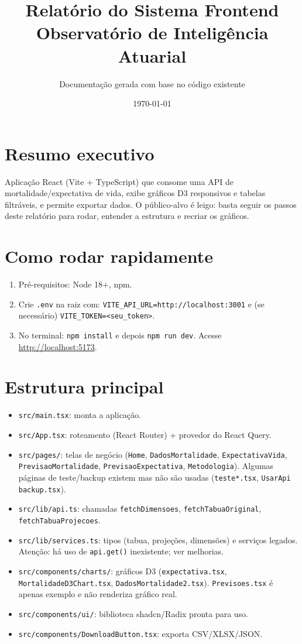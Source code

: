 \documentclass[12pt,a4paper]{article}
\title{Relatório do Sistema Frontend \\ \large Observatório de Inteligência Atuarial}
\author{Documentação gerada com base no código existente}
\date{\today}
\begin{document}
\maketitle

\section{Resumo executivo}
Aplicação React (Vite + TypeScript) que consome uma API de mortalidade/expectativa de vida, exibe gráficos D3 responsivos e tabelas filtráveis, e permite exportar dados. O público-alvo é leigo: basta seguir os passos deste relatório para rodar, entender a estrutura e recriar os gráficos.

\section{Como rodar rapidamente}
\begin{enumerate}[leftmargin=*]
  \item Pré-requisitos: Node 18+, npm.
  \item Crie \texttt{.env} na raiz com: \texttt{VITE\_API\_URL=http://localhost:3001} e (se necessário) \texttt{VITE\_TOKEN=<seu\_token>}.
  \item No terminal: \texttt{npm install} e depois \texttt{npm run dev}. Acesse \url{http://localhost:5173}.
\end{enumerate}

\section{Estrutura principal}
\begin{itemize}[leftmargin=*]
  \item \texttt{src/main.tsx}: monta a aplicação.
  \item \texttt{src/App.tsx}: roteamento (React Router) + provedor do React Query.
  \item \texttt{src/pages/}: telas de negócio (\texttt{Home}, \texttt{DadosMortalidade}, \texttt{ExpectativaVida}, \texttt{PrevisaoMortalidade}, \texttt{PrevisaoExpectativa}, \texttt{Metodologia}). Algumas páginas de teste/backup existem mas não são usadas (\texttt{teste*.tsx}, \texttt{UsarApi backup.tsx}).
  \item \texttt{src/lib/api.ts}: chamadas \texttt{fetchDimensoes}, \texttt{fetchTabuaOriginal}, \texttt{fetchTabuaProjecoes}.
  \item \texttt{src/lib/services.ts}: tipos (tabua, projeções, dimensões) e serviços legados. Atenção: há uso de \texttt{api.get()} inexistente; ver melhorias.
  \item \texttt{src/components/charts/}: gráficos D3 (\texttt{expectativa.tsx}, \texttt{MortalidadeD3Chart.tsx}, \texttt{DadosMortalidade2.tsx}). \texttt{Previsoes.tsx} é apenas exemplo e não renderiza gráfico real.
  \item \texttt{src/components/ui/}: biblioteca shadcn/Radix pronta para uso.
  \item \texttt{src/components/DownloadButton.tsx}: exporta CSV/XLSX/JSON.
\end{itemize}
\end{document}
